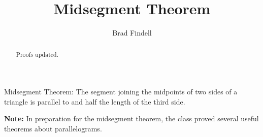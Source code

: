 \documentclass[nooutcomes]{ximera}
\title{Midsegment Theorem}
\author{Brad Findell}
\begin{document}
\begin{abstract}
Proofs updated. 
\end{abstract}
\maketitle


\begin{theorem}
Midsegment Theorem: The segment joining the midpoints of two sides of a triangle is parallel to and half the length of the third side.
\end{theorem}


\textbf{Note:} In preparation for the midsegment theorem, the class proved several useful theorems about parallelograms. 

\end{document}
